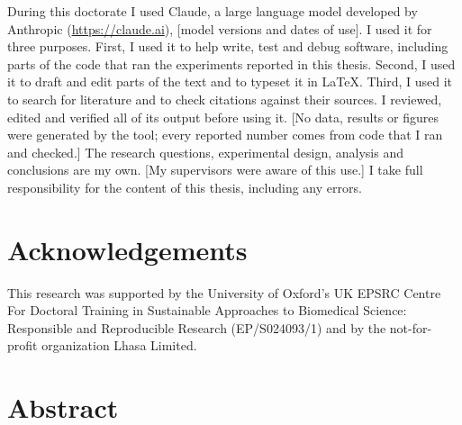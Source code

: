 \documentclass[a4paper,12pt]{report}
\numberwithin{equation}{chapter}
\begin{document}
During this doctorate I used Claude, a large language model developed by Anthropic
(\url{https://claude.ai}), [model versions and dates of use]. I used it for three purposes.
First, I used it to help write, test and debug software, including parts of the code that ran
the experiments reported in this thesis. Second, I used it to draft and edit parts of the text
and to typeset it in \LaTeX{}. Third, I used it to search for literature and to check citations
against their sources. I reviewed, edited and verified all of its output before using it.
[No data, results or figures were generated by the tool; every reported number comes from code
that I ran and checked.] The research questions, experimental design, analysis and conclusions
are my own. [My supervisors were aware of this use.] I take full responsibility for the content
of this thesis, including any errors.

\chapter*{Acknowledgements}



This research was supported by the University of Oxford's UK EPSRC Centre For Doctoral Training in
Sustainable Approaches to Biomedical Science: Responsible and Reproducible Research
(EP/S024093/1) and by the not-for-profit organization Lhasa Limited.


\chapter*{Abstract}
\end{document}
